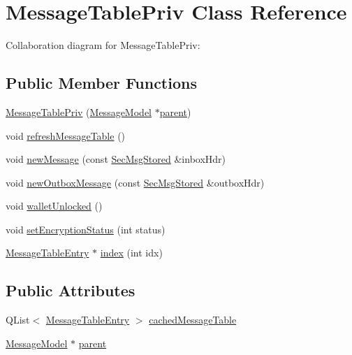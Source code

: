 \hypertarget{class_message_table_priv}{}\section{Message\+Table\+Priv Class Reference}
\label{class_message_table_priv}


Collaboration diagram for Message\+Table\+Priv\+:
\subsection*{Public Member Functions}
\begin{DoxyCompactItemize}
\item 
\hyperlink{class_message_table_priv_a1bb3ea4ad988ee9832d757b09094b63d}{Message\+Table\+Priv} (\hyperlink{class_message_model}{Message\+Model} $\ast$\hyperlink{class_message_table_priv_a74b87dfad5028d83a91cbde919b9c908}{parent})
\item 
void \hyperlink{class_message_table_priv_a0c420e61982703babe27416089ff2bd3}{refresh\+Message\+Table} ()
\item 
void \hyperlink{class_message_table_priv_a7769c63c504ab64c04e0699c4f4aacd3}{new\+Message} (const \hyperlink{class_sec_msg_stored}{Sec\+Msg\+Stored} \&inbox\+Hdr)
\item 
void \hyperlink{class_message_table_priv_a4718ccab000f83181ada7e74df2e80b4}{new\+Outbox\+Message} (const \hyperlink{class_sec_msg_stored}{Sec\+Msg\+Stored} \&outbox\+Hdr)
\item 
void \hyperlink{class_message_table_priv_a21b0c066bfb4d0efe388ebe83317c33f}{wallet\+Unlocked} ()
\item 
void \hyperlink{class_message_table_priv_abe5ab36edddd1fd4c1a0b6c63d0ea70d}{set\+Encryption\+Status} (int status)
\item 
\hyperlink{struct_message_table_entry}{Message\+Table\+Entry} $\ast$ \hyperlink{class_message_table_priv_a486a0f31e9010cc15e0544f65cb07211}{index} (int idx)
\end{DoxyCompactItemize}
\subsection*{Public Attributes}
\begin{DoxyCompactItemize}
\item 
Q\+List$<$ \hyperlink{struct_message_table_entry}{Message\+Table\+Entry} $>$ \hyperlink{class_message_table_priv_a680444470b8af7cd4bf84dbe488948c2}{cached\+Message\+Table}
\item 
\hyperlink{class_message_model}{Message\+Model} $\ast$ \hyperlink{class_message_table_priv_a74b87dfad5028d83a91cbde919b9c908}{parent}
\end{DoxyCompactItemize}



